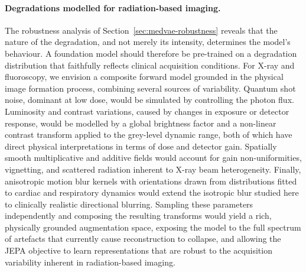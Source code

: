 \documentclass[conference]{IEEEtran}
\begin{document}
\paragraph{Degradations modelled for radiation-based imaging.}
The robustness analysis of Section~\ref{sec:medvae-robustness} reveals that the nature of the degradation, and not merely its intensity, determines the model's behaviour. A foundation model should therefore be pre-trained on a degradation distribution that faithfully reflects clinical acquisition conditions. For X-ray and fluoroscopy, we envision a composite forward model grounded in the physical image formation process, combining several sources of variability. Quantum shot noise, dominant at low dose, would be simulated by controlling the photon flux. Luminosity and contrast variations, caused by changes in exposure or detector response, would be modelled by a global brightness factor and a non-linear contrast transform applied to the grey-level dynamic range, both of which have direct physical interpretations in terms of dose and detector gain. Spatially smooth multiplicative and additive fields would account for gain non-uniformities, vignetting, and scattered radiation inherent to X-ray beam heterogeneity. Finally, anisotropic motion blur kernels with orientations drawn from distributions fitted to cardiac and respiratory dynamics would extend the isotropic blur studied here to clinically realistic directional blurring. Sampling these parameters independently and composing the resulting transforms would yield a rich, physically grounded augmentation space, exposing the model to the full spectrum of artefacts that currently cause reconstruction to collapse, and allowing the JEPA objective to learn representations that are robust to the acquisition variability inherent in radiation-based imaging.
\end{document}
